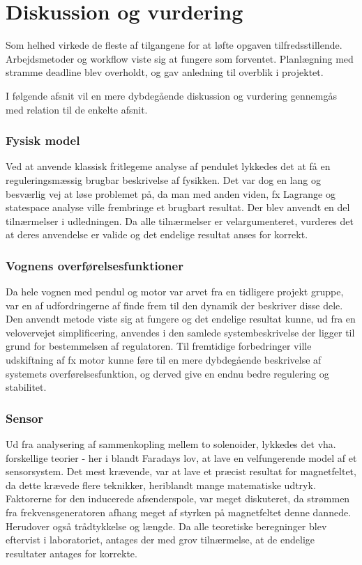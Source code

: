 \chapter{Diskussion og vurdering}\label{kap:diskussion}
Som helhed virkede de fleste af tilgangene for at løfte opgaven tilfredsstillende.
Arbejdsmetoder og workflow viste sig at fungere som forventet.
Planlægning med stramme deadline blev overholdt, og gav anledning til overblik i projektet.

I følgende afsnit vil en mere dybdegående diskussion og vurdering gennemgås med relation til de enkelte afsnit. 

\subsection{Fysisk model}
Ved at anvende klassisk fritlegeme analyse af pendulet lykkedes det at få en reguleringsmæssig brugbar beskrivelse af fysikken. 
Det var dog en lang og besværlig vej at løse problemet på, da man med anden viden, fx Lagrange og statespace analyse ville frembringe et brugbart resultat.
Der blev anvendt en del tilnærmelser i udledningen. 
Da alle tilnærmelser er velargumenteret, vurderes det at deres anvendelse er valide og det endelige resultat anses for korrekt.   

\subsection{Vognens overførelsesfunktioner}
Da hele vognen med pendul og motor var arvet fra en tidligere projekt gruppe, var en af udfordringerne af finde frem til den dynamik der beskriver disse dele.
Den anvendt metode viste sig at fungere og det endelige resultat kunne, ud fra en velovervejet simplificering, anvendes i den samlede systembeskrivelse der ligger til grund for bestemmelsen af regulatoren.
Til fremtidige forbedringer ville udskiftning af fx motor kunne føre til en mere dybdegående beskrivelse af systemets overførelsesfunktion, og derved give en endnu bedre regulering og stabilitet.

\subsection{Sensor}
Ud fra analysering af sammenkopling mellem to solenoider, lykkedes det vha. forskellige teorier - her i blandt Faradays lov, at lave en velfungerende model af et sensorsystem. 
Det mest krævende, var at lave et præcist resultat for magnetfeltet, da dette krævede flere teknikker, heriblandt mange matematiske udtryk.
Faktorerne for den inducerede afsenderspole, var meget diskuteret, da strømmen fra frekvensgeneratoren afhang meget af styrken på magnetfeltet denne dannede.
Herudover også trådtykkelse og længde. 
Da alle teoretiske beregninger blev eftervist i laboratoriet, antages der med grov tilnærmelse, at de endelige resultater antages for korrekte.

